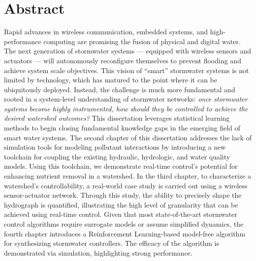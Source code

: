 \begingroup
\let\clearpage\relax
\let\cleardoublepage\relax
\let\cleardoublepage\relax

\chapter*{Abstract}
\vspace{-0.5cm}
Rapid advances in wireless communication, embedded systems, and high-performance computing are promising the fusion of physical and digital water.
The next generation of stormwater systems --- equipped with wireless sensors and actuators --- will autonomously reconfigure themselves to prevent  flooding and achieve system scale objectives.
This vision of ``smart'' stormwater systems is not limited by technology, which has matured to the point where it can be ubiquitously deployed.
Instead, the challenge is much more fundamental and rooted in a system-level understanding of stormwater networks: \textit{once stormwater systems become highly instrumented, how should they be controlled to achieve the desired watershed outcomes?} This dissertation leverages statistical learning methods to begin closing fundamental knowledge gaps in the emerging field of smart water systems.
The second chapter of this dissertation addresses the lack of simulation tools for modeling pollutant interactions by introducing a new toolchain for coupling the existing hydraulic, hydrologic, and water quality models.
Using this toolchain, we demonstrate real-time control's potential for enhancing nutrient removal in a watershed.
In the third chapter, to characterize a watershed's controllability, a real-world case study is carried out using a wireless sensor-actuator network.
Through this study, the ability to precisely shape the hydrograph is quantified, illustrating the high level of granularity that can be achieved using real-time control. 
Given that most state-of-the-art stormwater control algorithms require surrogate models or assume simplified dynamics, the fourth chapter introduces a Reinforcement Learning-based model-free algorithm for synthesizing stormwater controllers.
The efficacy of the algorithm is demonstrated via simulation, highlighting strong performance.
